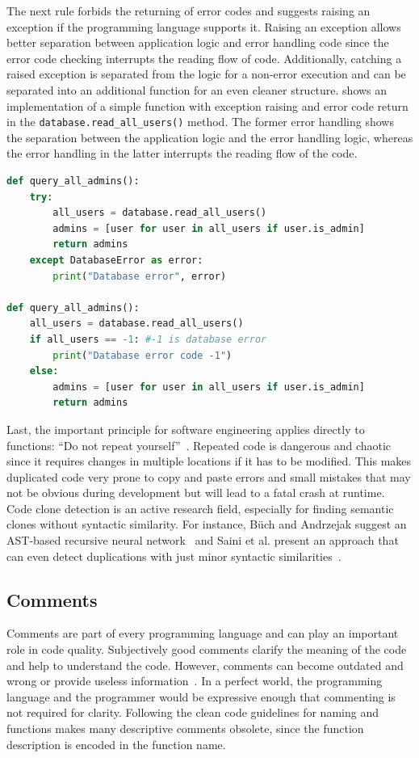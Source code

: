 The next rule forbids the returning of error codes and suggests raising an exception if the programming language supports it. Raising an exception allows better separation between application logic and error handling code since the error code checking interrupts the reading flow of code. Additionally, catching a raised exception is separated from the logic for a non-error execution and can be separated into an additional function for an even cleaner structure.  shows an implementation of a simple function with exception raising and error code return in the \texttt{database.read\_all\_users()} method. The former error handling shows the separation between the application logic and the error handling logic, whereas the error handling in the latter interrupts the reading flow of the code.

\begin{lstlisting}[float=t , language=Python, label=lst:error_catching, caption={Sample listing for error handling with try and except statements vs error codes.}]
def query_all_admins():
    try:
        all_users = database.read_all_users()
        admins = [user for user in all_users if user.is_admin]
        return admins
    except DatabaseError as error:
        print("Database error", error)

def query_all_admins():
    all_users = database.read_all_users()
    if all_users == -1: #-1 is database error
        print("Database error code -1")
    else:
        admins = [user for user in all_users if user.is_admin]
        return admins
\end{lstlisting}


Last, the important principle for software engineering applies directly to functions: \enquote{Do not repeat yourself}~\cite{haoyu_basic_2012}. Repeated code is dangerous and chaotic since it requires changes in multiple locations if it has to be modified. This makes duplicated code very prone to copy and paste errors and small mistakes that may not be obvious during development but will lead to a fatal crash at runtime. Code clone detection is an active research field, especially for finding semantic clones without syntactic similarity. For instance, Büch and Andrzejak suggest an AST-based recursive neural network~\cite{buch_learning-based_2019} and Saini et al. present an approach that can even detect duplications with just minor syntactic similarities~\cite{saini_oreo_2018}.

\subsection{Comments}
Comments are part of every programming language and can play an important role in code quality. Subjectively good comments clarify the meaning of the code and help to understand the code. However, comments can become outdated and wrong or provide useless information~\cite{martin_clean_2009}. In a perfect world, the programming language and the programmer would be expressive enough that commenting is not required for clarity. Following the clean code guidelines for naming and functions makes many descriptive comments obsolete, since the function description is encoded in the function name.

